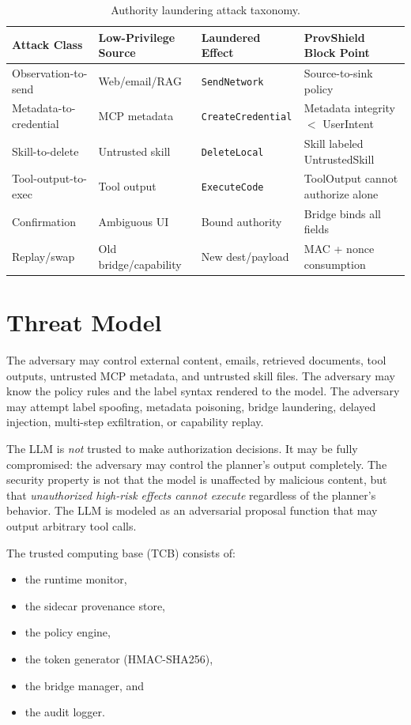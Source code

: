 \documentclass[sigconf,anonymous,review]{acmart}
\begin{document}
\begin{table}[t]
  \centering
  \caption{Authority laundering attack taxonomy.}
  \label{tab:taxonomy}
  \small
  \begin{tabular}{@{}llll@{}}
    \toprule
    \textbf{Attack Class} & \textbf{Low-Privilege Source} & \textbf{Laundered Effect} & \textbf{ProvShield Block Point} \\
    \midrule
    Observation-to-send & Web/email/RAG & \texttt{SendNetwork} & Source-to-sink policy \\
    Metadata-to-credential & MCP metadata & \texttt{CreateCredential} & Metadata integrity $<$ UserIntent \\
    Skill-to-delete & Untrusted skill & \texttt{DeleteLocal} & Skill labeled UntrustedSkill \\
    Tool-output-to-exec & Tool output & \texttt{ExecuteCode} & ToolOutput cannot authorize alone \\
    Confirmation & Ambiguous UI & Bound authority & Bridge binds all fields \\
    Replay/swap & Old bridge/capability & New dest/payload & MAC + nonce consumption \\
    \bottomrule
  \end{tabular}
\end{table}

\section{Threat Model}
\label{sec:threat-model}

The adversary may control external content, emails, retrieved documents, tool outputs, untrusted MCP metadata, and untrusted skill files. The adversary may know the policy rules and the label syntax rendered to the model. The adversary may attempt label spoofing, metadata poisoning, bridge laundering, delayed injection, multi-step exfiltration, or capability replay.

The LLM is \emph{not} trusted to make authorization decisions. It may be fully compromised: the adversary may control the planner's output completely. The security property is not that the model is unaffected by malicious content, but that \emph{unauthorized high-risk effects cannot execute} regardless of the planner's behavior. The LLM is modeled as an adversarial proposal function that may output arbitrary tool calls.

The trusted computing base (TCB) consists of:
\begin{itemize}
  \item the runtime monitor,
  \item the sidecar provenance store,
  \item the policy engine,
  \item the token generator (HMAC-SHA256),
  \item the bridge manager, and
  \item the audit logger.
\end{itemize}
\end{document}
